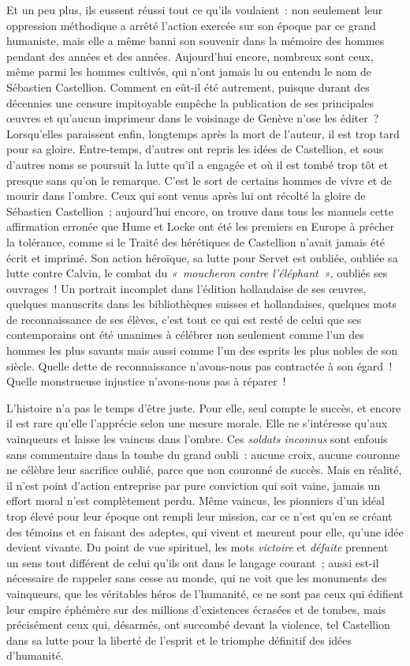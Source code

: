 \documentclass[french,twoside]{book} %
\newcommand\chapterclose{} %
\begin{document}
Et un peu plus, ils eussent réussi tout ce qu’ils voulaient : non seulement leur oppression méthodique a arrêté l’action exercée sur son époque par ce grand humaniste, mais elle a même banni son souvenir dans la mémoire des hommes pendant des années et des années. Aujourd’hui encore, nombreux sont ceux, même parmi les hommes cultivés, qui n’ont jamais lu ou entendu le nom de Sébastien Castellion. Comment en eût-il été autrement, puisque durant des décennies une censure impitoyable empêche la publication de ses principales œuvres et qu’aucun imprimeur dans le voisinage de Genève n’ose les éditer ? Lorsqu’elles paraissent enfin, longtemps après la mort de l’auteur, il est trop tard pour sa gloire. Entre-temps, d’autres ont repris les idées de Castellion, et sous d’autres noms se poursuit la lutte qu’il a engagée et où il est tombé trop tôt et presque sans qu’on le remarque. C’est le sort de certains hommes de vivre et de mourir dans l’ombre. Ceux qui sont venus après lui ont récolté la gloire de Sébastien Castellion ; aujourd’hui encore, on trouve dans tous les manuels cette affirmation erronée que Hume et Locke ont été les premiers en Europe à prêcher la tolérance, comme si le Traité des hérétiques de Castellion n’avait jamais été écrit et imprimé. Son action héroïque, sa lutte pour Servet est oubliée, oubliée sa lutte contre Calvin, le combat du \emph{« moucheron contre l’éléphant »}, oubliés ses ouvrages ! Un portrait incomplet dans l’édition hollandaise de ses œuvres, quelques manuscrits dans les bibliothèques suisses et hollandaises, quelques mots de reconnaissance de ses élèves, c’est tout ce qui est resté de celui que ses contemporains ont été unanimes à célébrer non seulement comme l’un des hommes les plus savants mais aussi comme l’un des esprits les plus nobles de son siècle. Quelle dette de reconnaissance n’avons-nous pas contractée à son égard ! Quelle monstrueuse injustice n’avons-nous pas à réparer !\par
L’histoire n’a pas le temps d’être juste. Pour elle, seul compte le succès, et encore il est rare qu’elle l’apprécie selon une mesure morale. Elle ne s’intéresse qu’aux vainqueurs et laisse les vaincus dans l’ombre. Ces \emph{soldats inconnus} sont enfouis sans commentaire dans la tombe du grand oubli : aucune croix, aucune couronne ne célèbre leur sacrifice oublié, parce que non couronné de succès. Mais en réalité, il n’est point d’action entreprise par pure conviction qui soit vaine, jamais un effort moral n’est complètement perdu. Même vaincus, les pionniers d’un idéal trop élevé pour leur époque ont rempli leur mission, car ce n’est qu’en se créant des témoins et en faisant des adeptes, qui vivent et meurent pour elle, qu’une idée devient vivante. Du point de vue spirituel, les mots \emph{victoire} et \emph{défaite} prennent un sens tout différent de celui qu’ils ont dans le langage courant ; aussi est-il nécessaire de rappeler sans cesse au monde, qui ne voit que les monuments des vainqueurs, que les véritables héros de l’humanité, ce ne sont pas ceux qui édifient leur empire éphémère sur des millions d’existences écrasées et de tombes, mais précisément ceux qui, désarmés, ont succombé devant la violence, tel Castellion dans sa lutte pour la liberté de l’esprit et le triomphe définitif des idées d’humanité.
\chapterclose
\end{document}
